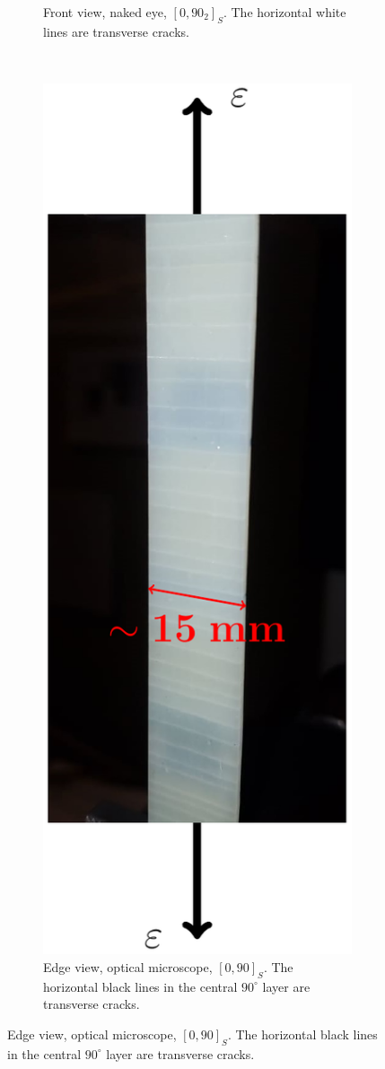 \begin{figure}[!h]
\begin{subfigure}[b]{0.45\textwidth}
       \caption{Front view, naked eye, $\left[0,90_{2}\right]_{S}$. The horizontal white lines are transverse cracks.}
    \end{subfigure}
    ~
    \begin{subfigure}[b]{0.45\textwidth}
        \includegraphics[width=\textwidth]{pics/transversecracks-macro.pdf}
       \caption{Edge view, optical microscope, $\left[0,90\right]_{S}$. The horizontal black lines in the central $90^{\circ}$ layer are transverse cracks.}
    \end{subfigure}


\end{figure}
